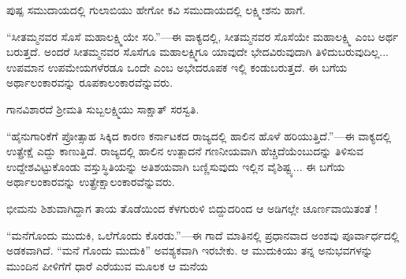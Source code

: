 \noindent\hspace*{1.2em}\hspace{0.6em}ಪುಷ್ಪ ಸಮುದಾಯದಲ್ಲಿ ಗುಲಾಬಿಯು ಹೇಗೋ ಕವಿ ಸಮುದಾಯದಲ್ಲಿ ಲಕ್ಷ್ಮೀಶನು ಹಾಗೆ.\par


\indent “ಸೀತಮ್ಮನವರ ಸೊಸೆ ಮಹಾಲಕ್ಷ್ಮಿಯೇ ಸರಿ.”—ಈ ವಾಕ್ಯದಲ್ಲಿ, ಸೀತಮ್ಮನವರ ಸೊಸೆಯೇ ಮಹಾಲಕ್ಷ್ಮಿ ಎಂಬ ಅರ್ಥ ಬರುತ್ತದೆ. ಅಂದರೆ ಸೀತಮ್ಮನವರ ಸೊಸೆಗೂ ಮಹಾಲಕ್ಷ್ಮಿಗೂ ಯಾವುದೇ ಭೇದವಿರುವುದಾಗಿ ತಿಳಿದುಬರುವುದಿಲ್ಲ... ಉಪಮಾನ ಉಪಮೇಯಗಳೆರಡೂ ಒಂದೇ ಎಂಬ ಅಭೇದರೂಪಕ ಇಲ್ಲಿ ಕಂಡುಬರುತ್ತದೆ. ಈ ಬಗೆಯ ಅರ್ಥಾಲಂಕಾರವನ್ನು ರೂಪಕಾಲಂಕಾರವೆನ್ನುವರು.\par

\noindent\hspace*{1.2em}\hspace{0.6em}ಗಾನವಿಶಾರದೆ ಶ್ರೀಮತಿ ಸುಬ್ಬಲಕ್ಷ್ಮಿಯು ಸಾಕ್ಷಾತ್‌ ಸರಸ್ವತಿ.\par


\indent “ಹೈನುಗಾರಿಕೆಗೆ ಪ್ರೋತ್ಸಾಹ ಸಿಕ್ಕಿದ ಕಾರಣ ಕರ್ನಾಟಕದ ರಾಜ್ಯದಲ್ಲಿ ಹಾಲಿನ ಹೊಳೆ ಹರಿಯುತ್ತಿದೆ.”—ಈ ವಾಕ್ಯದಲ್ಲಿ ಉತ್ಪ್ರೇಕ್ಷೆ ಎದ್ದು ಕಾಣುತ್ತಿದೆ. ರಾಜ್ಯದಲ್ಲಿ ಹಾಲಿನ ಉತ್ಪಾದನೆ ಗಣನೀಯವಾಗಿ ಹೆಚ್ಚಿದೆಯೆಂಬುದನ್ನು ತಿಳಿಸುವ ಉದ್ದೇಶವಿಟ್ಟುಕೊಂಡು ವಸ್ತುಸ್ಥಿತಿಯನ್ನು ಅತಿಶಯವಾಗಿ ಬಣ್ಣಿಸುವುದು ಇಲ್ಲಿನ ವೈಶಿಷ್ಟ್ಯ... ಈ ಬಗೆಯ ಅರ್ಥಾಲಂಕಾರವನ್ನು ಉತ್ಪ್ರೇಕ್ಷಾಲಂಕಾರವೆನ್ನುವರು.\par

\noindent\hspace*{1.2em}\hspace{0.6em}ಭೀಮನು ಶಿಶುವಾಗಿದ್ದಾಗ ತಾಯ ತೊಡೆಯಿಂದ ಕೆಳಗುರುಳಿ ಬಿದ್ದುದರಿಂದ ಆ ಅಡಿಗಲ್ಲೇ ಚೂರ್ಣವಾಯಿತಂತೆ !\par


\indent “ಮನೆಗೊಂದು ಮುದುಕಿ, ಒಲೆಗೊಂದು ಕೊರಡು.”—ಈ ಗಾದೆ ಮಾತಿನಲ್ಲಿ ಪ್ರಧಾನವಾದ ಅಂಶವು ಪೂರ್ವಾರ್ಧದಲ್ಲಿ ಅಡಕವಾಗಿದೆ. “ಮನೆ ಗೊಂದು ಮುದುಕಿ” ಅವಶ್ಯಕವಾಗಿ ಇರಬೇಕು. ಆ ಮುದುಕಿಯು ತನ್ನ ಅನುಭವಗಳನ್ನು ಮುಂದಿನ ಪೀಳಿಗೆಗೆ ಧಾರೆ ಎರೆಯುವ ಮೂಲಕ ಆ ಮನೆಯ\kbvcontinues
